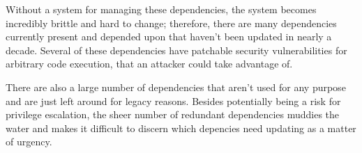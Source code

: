 Without a system for managing these dependencies, the system becomes incredibly brittle and hard to change; therefore, there are many dependencies currently present and depended upon that haven't been updated in nearly a decade.
Several of these dependencies have patchable security vulnerabilities for arbitrary code execution, that an attacker could take advantage of.

There are also a large number of dependencies that aren't used for any purpose and are just left around for legacy reasons.
Besides potentially being a risk for privilege escalation, the sheer number of redundant dependencies muddies the water and makes it difficult to discern which depencies need updating as a matter of urgency.

